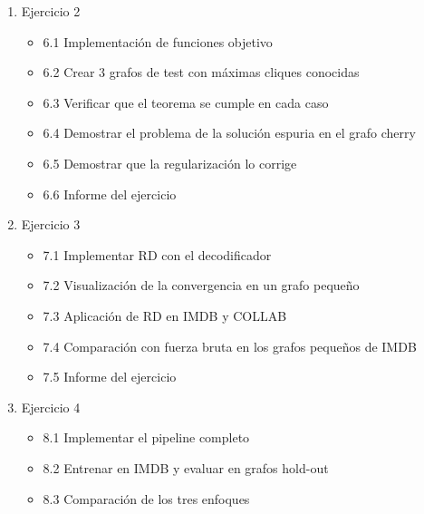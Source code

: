 \documentclass[11pt]{article}
\providecommand{\tightlist}{%
      \setlength{\itemsep}{0pt}\setlength{\parskip}{0pt}}
\begin{document}
\begin{enumerate}
  \begin{itemize}
  \tightlist
  \item
    5.1 Implementar \texttt{is\_clique()} y
    \texttt{brute\_force\_max\_clique()}
  \item
    5.2 Prueba en un grafo sintético pequeño
  \item
    5.3 Aplicación a los primeros 20 grafos de IMDB y contraste
    adicional con COLLAB
  \item
    5.4 Informe del ejercicio
  \end{itemize}
\item
  Ejercicio 2

  \begin{itemize}
  \tightlist
  \item
    6.1 Implementación de funciones objetivo
  \item
    6.2 Crear 3 grafos de test con máximas cliques conocidas
  \item
    6.3 Verificar que el teorema se cumple en cada caso
  \item
    6.4 Demostrar el problema de la solución espuria en el grafo cherry
  \item
    6.5 Demostrar que la regularización lo corrige
  \item
    6.6 Informe del ejercicio
  \end{itemize}
\item
  Ejercicio 3

  \begin{itemize}
  \tightlist
  \item
    7.1 Implementar RD con el decodificador
  \item
    7.2 Visualización de la convergencia en un grafo pequeño
  \item
    7.3 Aplicación de RD en IMDB y COLLAB
  \item
    7.4 Comparación con fuerza bruta en los grafos pequeños de IMDB
  \item
    7.5 Informe del ejercicio
  \end{itemize}
\item
  Ejercicio 4

  \begin{itemize}
  \tightlist
  \item
    8.1 Implementar el pipeline completo
  \item
    8.2 Entrenar en IMDB y evaluar en grafos hold-out
  \item
    8.3 Comparación de los tres enfoques


\end{itemize}
\end{enumerate}
\end{document}
